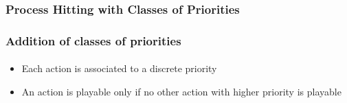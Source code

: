 
\begin{frame}[c]
  \frametitle{Process Hitting with Classes of Priorities}


\end{frame}



\begin{frame}[t]
  \frametitle{Addition of classes of priorities}
  \framesubtitle{\tcite{\cfpmrcsbio}}

\bigskip
\begin{itemize}
  \item Each action is associated to a discrete priority
  \item An action is playable only if no other action with higher priority is playable
\end{itemize}

\medskip

\begin{center}


\end{center}
\end{frame}
